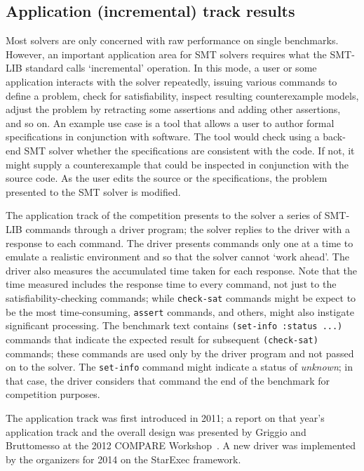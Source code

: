 \documentclass[twoside,11pt]{article}
\begin{document}
\subsection{Application (incremental) track results}
\label{sec:application-results}

Most solvers are only concerned with raw performance on single benchmarks. However, an important application area for SMT solvers requires what the SMT-LIB standard calls `incremental' operation.
In this mode, a user or some application interacts with the solver repeatedly, issuing various commands to define a problem, check for satisfiability, inspect resulting counterexample models, adjust the problem by retracting some assertions and adding other assertions, and so on. An example use case is a tool that allows a user to author formal specifications in conjunction with software. The tool would
check using a back-end SMT solver whether the specifications are consistent with the code. If not, it might
supply a counterexample that could be inspected in conjunction with the source code. As the user edits the source or the specifications, the problem presented to the SMT solver is modified. 

The application track of the competition presents to the solver a series of SMT-LIB commands through a driver program; the solver replies to the driver with a 
response to each command. The driver presents commands only one at a time to emulate a realistic environment and so that the solver cannot `work ahead'. The driver also measures the accumulated time taken for each response. Note that the time measured includes the response time to every command, not just to the satisfiability-checking commands; while \texttt{check-sat} commands might be expect to be the most time-consuming, \texttt{assert} commands, and others, might also instigate significant processing. The benchmark text contains \texttt{(set-info :status ...)} commands that 
indicate the expected result for subsequent \texttt{(check-sat)} commands; these commands are used only by the driver program and not passed on to the solver. The \texttt{set-info} command might indicate a status of \textit{unknown}; in that case, the driver
considers that command the end of the benchmark for competition purposes.

The application track was first introduced in 2011; a report
on that year's application track and the overall design was presented by Griggio and Bruttomesso at the 
2012 COMPARE Workshop~\cite{ag+rb+12}. A new driver was implemented by the organizers for 2014 on the StarExec framework.
\end{document}
